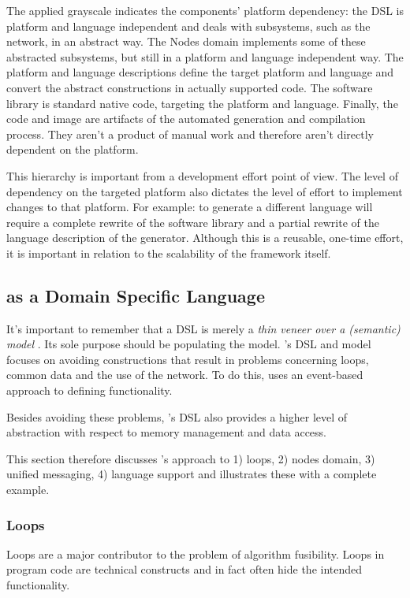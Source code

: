\documentclass[conference]{IEEEtran}
\begin{document}
The applied grayscale indicates the components' platform dependency: the DSL is
platform and language independent and deals with subsystems, such as the
network, in an abstract way. The Nodes domain implements some of these
abstracted subsystems, but still in a platform and language independent way.
The platform and language descriptions define the target platform and language
and convert the abstract constructions in actually supported code. The software
library is standard native code, targeting the platform and language. Finally,
the code and image are artifacts of the automated generation and compilation
process. They aren't a product of manual work and therefore aren't directly
dependent on the platform.

This hierarchy is important from a development effort point of view. The level
of dependency on the targeted platform also dictates the level of effort to
implement changes to that platform. For example: to generate a different
language will require a complete rewrite of the software library and a partial
rewrite of the language description of the generator. Although this is a
reusable, one-time effort, it is important in relation to the scalability of
the framework itself.

\subsection{\NAME as a Domain Specific Language}
\label{dsl-design}

It's important to remember that a DSL is merely a \emph{thin veneer over a
(semantic) model} \cite{fowler2010domain}. Its sole purpose should be
populating the model. \NAME's DSL and model focuses on avoiding constructions
that result in problems concerning loops, common data and the use of the
network. To do this, \NAME uses an event-based approach to defining
functionality.

Besides avoiding these problems, \NAME's DSL also provides a higher level of
abstraction with respect to memory management and data access.

This section therefore discusses \NAME's approach to 1) loops, 2) nodes domain,
3) unified messaging, 4) language support and illustrates these with a complete
example.

\subsubsection{Loops}

Loops are a major contributor to the problem of algorithm fusibility. Loops in
program code are technical constructs and in fact often hide the intended
functionality.
\end{document}
